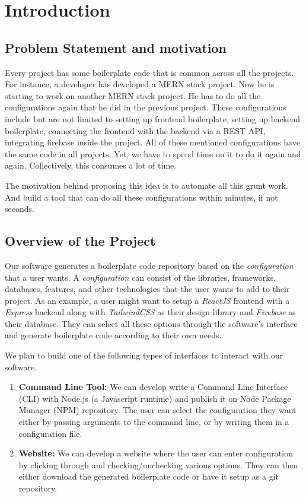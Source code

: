 \section{Introduction}

\subsection{Problem Statement and motivation}

Every project has some boilerplate code that is common across all the projects. For instance, a developer has developed a MERN stack project. Now he is starting to work on another MERN stack project. He has to do all the configurations again that he did in the previous project. These configurations include but are not limited to setting up frontend boilerplate, setting up backend boilerplate, connecting the frontend with the backend via a REST API, integrating firebase inside the project. All of these mentioned configurations have the same code in all projects. Yet, we have to spend time on it to do it again and again. Collectively, this consumes a lot of time.

The motivation behind proposing this idea is to automate all this grunt work. And build a tool that can do all these configurations within minutes, if not seconds.

\subsection{Overview of the Project}

Our software generates a boilerplate code repository based on the \emph{configuration} that a user wants. A \emph{configuration} can consist of the libraries, frameworks, databases, features, and other technologies that the user wants to add to their project. As an example, a user might want to setup a \emph{ReactJS} frontend with a \emph{Express} backend along with \emph{TailwindCSS} as their design library and \emph{Firebase} as their database. They can select all these options through the software's interface and generate boilerplate code according to their own needs.

We plan to build one of the following types of interfaces to interact with our software.
\begin{enumerate}
  \item \textbf{Command Line Tool:} We can develop write a Command Line Interface (CLI) with Node.js (a Javascript runtime) and publish it on Node Package Manager (NPM) repository. The user can select the configuration they want either by passing arguments to the command line, or by writing them in a configuration file.
  \item \textbf{Website:} We can develop a website where the user can enter configuration by clicking through and checking/unchecking various options. They can then either download the generated boilerplate code or have it setup as a git repository.
\end{enumerate}

